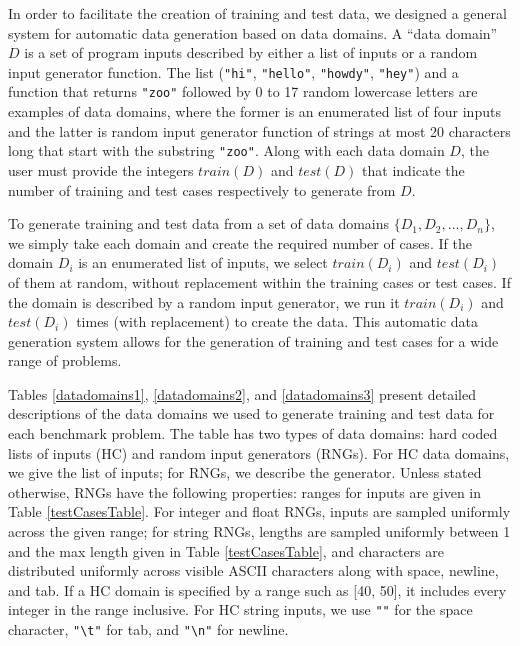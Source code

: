 \documentclass{sig-alternate}
\begin{document}

In order to facilitate the creation of training and test data, we designed a general system for automatic data generation based on data domains. A ``data domain'' $D$ is a set of program inputs described by either a list of inputs or a random input generator function. The list (\texttt{"hi"}, \texttt{"hello"}, \texttt{"howdy"}, \texttt{"hey"}) and a function that returns \texttt{"zoo"} followed by 0 to 17 random lowercase letters are examples of data domains, where the former is an enumerated list of four inputs and the latter is random input generator function of strings at most 20 characters long that start with the substring \texttt{"zoo"}. Along with each data domain $D$, the user must provide the integers $train(D)$ and $test(D)$ that indicate the number of training and test cases respectively to generate from $D$.

To generate training and test data from a set of data domains $\{D_1, D_2, ..., D_n \}$, we simply take each domain and create the required number of cases. If the domain $D_i$ is an enumerated list of inputs, we select $train(D_i)$ and $test(D_i)$ of them at random, without replacement within the training cases or test cases. If the domain is described by a random input generator, we run it $train(D_i)$ and $test(D_i)$ times (with replacement) to create the data. This automatic data generation system allows for the generation of training and test cases for a wide range of problems.


Tables \ref{datadomains1}, \ref{datadomains2}, and \ref{datadomains3} present detailed descriptions of the data domains we used to generate training and test data for each benchmark problem. The table has two types of data domains: hard coded lists of inputs (HC) and random input generators (RNGs). For HC data domains, we give the list of inputs; for RNGs, we describe the generator. Unless stated otherwise, RNGs have the following properties: ranges for inputs are given in Table \ref{testCasesTable}. For integer and float RNGs, inputs are sampled uniformly across the given range; for string RNGs, lengths are sampled uniformly between 1 and the max length given in Table \ref{testCasesTable}, and characters are distributed uniformly across visible ASCII characters along with space, newline, and tab. If a HC domain is specified by a range such as [40, 50], it includes every integer in the range inclusive. For HC string inputs, we use \texttt{"\textvisiblespace"} for the space character, \texttt{"\textbackslash t"} for tab, and \texttt{"\textbackslash n"} for newline.
\end{document}
